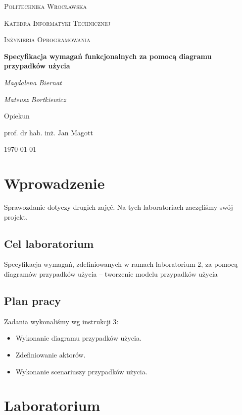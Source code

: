 \documentclass{article}
\begin{document}
	
	\begin{titlepage}
		\centering
		{\scshape\LARGE Politechnika Wrocławska \par}
		{\scshape\Large Katedra Informatyki Technicznej\par}
		
		\vspace{1cm}
		{\scshape\Large Inżynieria Oprogramowania\par}
		\vspace{1.5cm}
		{\huge\bfseries Specyfikacja wymagań funkcjonalnych za pomocą diagramu przypadków użycia\par}
		\vspace{2cm}
		{\Large\itshape Magdalena Biernat\par}
		{\Large\itshape Mateusz Bortkiewicz\par}
		\vfill
		Opiekun\par
		prof. dr hab. inż. Jan Magott 
		
		\vfill
		{\large \today\par}
	\end{titlepage}
	\newpage
	
	\section{Wprowadzenie}
	Sprawozdanie dotyczy drugich zajęć. Na tych laboratoriach zaczęliśmy swój projekt. 
	
	\subsection{Cel laboratorium}
Specyfikacja wymagań, zdefiniowanych w ramach laboratorium 2, za pomocą diagramów przypadków użycia – tworzenie modelu
przypadków użycia 
	
	\subsection{Plan pracy}
	Zadania wykonaliśmy wg instrukcji 3:

	\begin{itemize}
		\item Wykonanie diagramu przypadków użycia.
		\item Zdefiniowanie aktorów.
		\item Wykonanie scenariuszy przypadków użycia.
	\end{itemize}
\newpage
	\section{Laboratorium}
\end{document}
